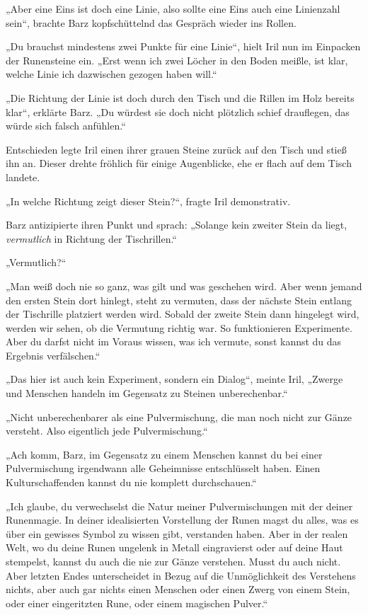 „Aber eine Eins ist doch eine Linie, also sollte eine Eins auch eine Linienzahl sein“, brachte Barz kopfschüttelnd das Gespräch wieder ins Rollen.

„Du brauchst mindestens zwei Punkte für eine Linie“, hielt Iril nun im Einpacken der Runensteine ein. „Erst wenn ich zwei Löcher in den Boden meißle, ist klar, welche Linie ich dazwischen gezogen haben will.“

„Die Richtung der Linie ist doch durch den Tisch und die Rillen im Holz bereits klar“, erklärte Barz. „Du würdest sie doch nicht plötzlich schief drauflegen, das würde sich falsch anfühlen.“

Entschieden legte Iril einen ihrer grauen Steine zurück auf den Tisch und stieß ihn an. Dieser drehte fröhlich für einige Augenblicke, ehe er flach auf dem Tisch landete.

„In welche Richtung zeigt dieser Stein?“, fragte Iril demonstrativ.

Barz antizipierte ihren Punkt und sprach: „Solange kein zweiter Stein da liegt, \textit{vermutlich} in Richtung der Tischrillen.“

„Vermutlich?“

„Man weiß doch nie so ganz, was gilt und was geschehen wird. Aber wenn jemand den ersten Stein dort hinlegt, steht zu vermuten, dass der nächste Stein entlang der Tischrille platziert werden wird. Sobald der zweite Stein dann hingelegt wird, werden wir sehen, ob die Vermutung richtig war. So funktionieren Experimente. Aber du darfst nicht im Voraus wissen, was ich vermute, sonst kannst du das Ergebnis verfälschen.“

„Das hier ist auch kein Experiment, sondern ein Dialog“, meinte Iril, „Zwerge und Menschen handeln im Gegensatz zu Steinen unberechenbar.“

„Nicht unberechenbarer als eine Pulvermischung, die man noch nicht zur Gänze versteht. Also eigentlich jede Pulvermischung.“

„Ach komm, Barz, im Gegensatz zu einem Menschen kannst du bei einer Pulvermischung irgendwann alle Geheimnisse entschlüsselt haben. Einen Kulturschaffenden kannst du nie komplett durchschauen.“

„Ich glaube, du verwechselst die Natur meiner Pulvermischungen mit der deiner Runenmagie. In deiner idealisierten Vorstellung der Runen magst du alles, was es über ein gewisses Symbol zu wissen gibt, verstanden haben. Aber in der realen Welt, wo du deine Runen ungelenk in Metall eingravierst oder auf deine Haut stempelst, kannst du auch die nie zur Gänze verstehen. Musst du auch nicht. Aber letzten Endes unterscheidet in Bezug auf die Unmöglichkeit des Verstehens nichts, aber auch gar nichts einen Menschen oder einen Zwerg von einem Stein, oder einer eingeritzten Rune, oder einem magischen Pulver.“

